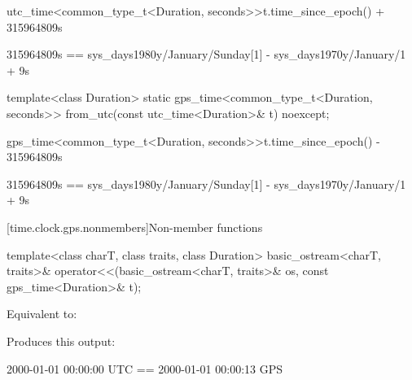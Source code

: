 \begin{itemdescr}
\pnum
\returns
\begin{codeblock}
utc_time<common_type_t<Duration, seconds>>{t.time_since_epoch()} + 315964809s
\end{codeblock}
\begin{note}
\begin{codeblock}
315964809s == sys_days{1980y/January/Sunday[1]} - sys_days{1970y/January/1} + 9s
\end{codeblock}
\end{note}
\end{itemdescr}

%
\begin{itemdecl}
template<class Duration>
  static gps_time<common_type_t<Duration, seconds>>
    from_utc(const utc_time<Duration>& t) noexcept;
\end{itemdecl}

\begin{itemdescr}
\pnum
\returns
\begin{codeblock}
gps_time<common_type_t<Duration, seconds>>{t.time_since_epoch()} - 315964809s
\end{codeblock}
\begin{note}
\begin{codeblock}
315964809s == sys_days{1980y/January/Sunday[1]} - sys_days{1970y/January/1} + 9s
\end{codeblock}
\end{note}
\end{itemdescr}

[time.clock.gps.nonmembers]{Non-member functions}

%
\begin{itemdecl}
template<class charT, class traits, class Duration>
  basic_ostream<charT, traits>&
    operator<<(basic_ostream<charT, traits>& os, const gps_time<Duration>& t);
\end{itemdecl}

\begin{itemdescr}
\pnum
\effects
Equivalent to:

\pnum
\begin{example}

Produces this output:
\begin{outputblock}
2000-01-01 00:00:00 UTC == 2000-01-01 00:00:13 GPS
\end{outputblock}
\end{example}
\end{itemdescr}

